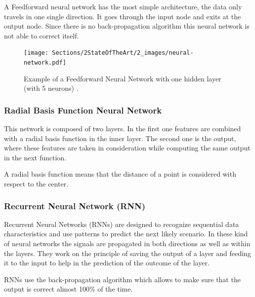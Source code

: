             \par A Feedforward neural network has the most simple architecture, the data only travels in one single direction. It goes through the input node and exits at the output node. Since there is no back-propagation algorithm this neural network is not able to correct itself. \cite{ArmaanMerchant2018}

            \begin{figure}[htb]
                \centering
                \texttt{[image: Sections/2StateOfTheArt/2\_images/neural-network.pdf]}
                \caption{ Example of a Feedforward Neural Network with one hidden layer (with 5 neurons) \cite{neural_image}. }  
            \end{figure}

            \newpage
            \subsubsection{Radial Basis Function Neural Network}

            \par This network is composed of two layers. In the first one features are combined with a radial basis function in the inner layer. The second one is the output, where these features are taken in consideration while computing the same output in the next function.
            \par A radial basis function means that the distance of a point is considered with respect to the center. \cite{ArmaanMerchant2018}


            \subsubsection{Recurrent Neural Network (RNN)} 

            \par Recurrent Neural Networks (RNNs) are designed to recognize sequential data characteristics and use patterns to predict the next likely scenario. In these kind of neural networks the signals are propagated in both directions as well as within the layers. They work on the principle of saving the output of a layer and feeding it to the input to help in the prediction of the outcome of the layer.
            \par RNNs use the back-propagation algorithm which allows to make sure that the output is correct almost 100\% of the time. \cite{ArmaanMerchant2018}
        


